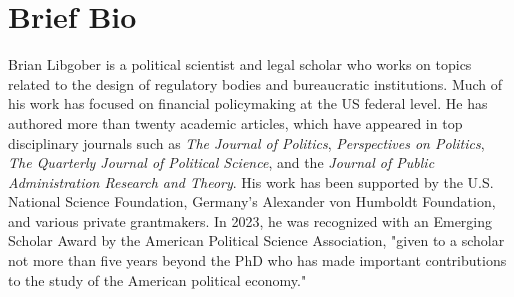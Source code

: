 \documentclass[12pt,letterpaper]{report}
\begin{document}
    \section*{Brief Bio}
    Brian Libgober is a political scientist and legal scholar who works on topics related to the design of regulatory bodies and bureaucratic institutions. Much of his work has focused on financial policymaking at the US federal level. He has authored more than twenty academic articles, which have appeared in top disciplinary journals such as  \textit{The Journal of Politics}, \textit{Perspectives on Politics}, \textit{The Quarterly Journal of Political Science}, and the \textit{Journal of Public Administration Research and Theory}. His work has been supported by the U.S. National Science Foundation, Germany's Alexander von Humboldt Foundation, and various private grantmakers.  In 2023, he was recognized with an Emerging Scholar Award by the American Political Science Association, "given to a scholar not more than five years beyond the PhD who has made important contributions to the study of the American political economy."
\end{document}

